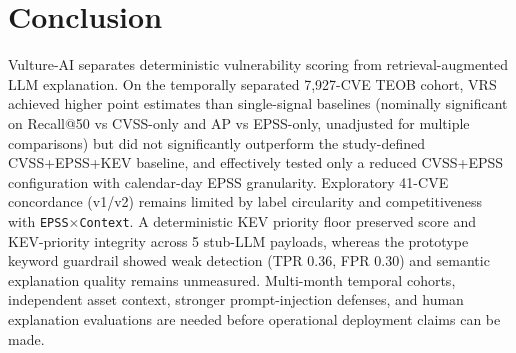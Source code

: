 \documentclass[conference]{IEEEtran}
\begin{document}
\section{Conclusion}
Vulture-AI separates deterministic vulnerability scoring from retrieval-augmented LLM explanation. On the temporally separated 7,927-CVE TEOB cohort, VRS achieved higher point estimates than single-signal baselines (nominally significant on Recall@50 vs CVSS-only and AP vs EPSS-only, unadjusted for multiple comparisons) but did not significantly outperform the study-defined CVSS+EPSS+KEV baseline, and effectively tested only a reduced CVSS+EPSS configuration with calendar-day EPSS granularity. Exploratory 41-CVE concordance (v1/v2) remains limited by label circularity and competitiveness with \texttt{EPSS$\times$Context}. A deterministic KEV priority floor preserved score and KEV-priority integrity across 5 stub-LLM payloads, whereas the prototype keyword guardrail showed weak detection (TPR 0.36, FPR 0.30) and semantic explanation quality remains unmeasured. Multi-month temporal cohorts, independent asset context, stronger prompt-injection defenses, and human explanation evaluations are needed before operational deployment claims can be made.

\enlargethispage{4\baselineskip}


\end{document}
